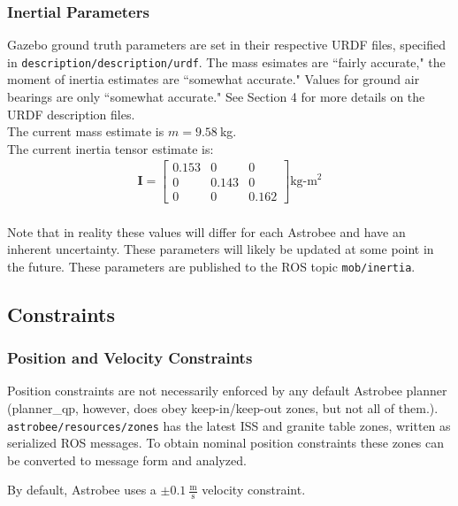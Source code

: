 \documentclass{article}
\begin{document}
\subsubsection{Inertial Parameters}

Gazebo ground truth parameters are set in their respective URDF files, specified in \texttt{description/description/urdf}. The mass esimates are ``fairly accurate," the moment of inertia estimates are ``somewhat accurate." Values for ground air bearings are only ``somewhat accurate." See Section 4 for more details on the URDF description files.
\\

The current mass estimate is $m = 9.58\ $kg.
\\

The current inertia tensor estimate is:
\begin{align*}
    \mathbf{I} =  
    \begin{bmatrix}
              0.153 & 0 & 0\\
              0 & 0.143 & 0\\
              0 & 0 & 0.162
    \end{bmatrix}  \text{kg-m}^2\\
\end{align*}

\noindent Note that in reality these values will differ for each Astrobee and have an inherent uncertainty. These parameters will likely be updated at some point in the future. These parameters are published to the ROS topic \texttt{mob/inertia}.

\subsection{Constraints}
\subsubsection{Position and Velocity Constraints}

Position constraints are not necessarily enforced by any default Astrobee planner (planner\_qp, however, does obey keep-in/keep-out zones, but not all of them.). \texttt{astrobee/resources/zones} has the latest ISS and granite table zones, written as serialized ROS messages. To obtain nominal position constraints these zones can be converted to message form and analyzed.

By default, Astrobee uses a $\pm 0.1 \ \frac{\text{m}}{\text{s}}$ velocity constraint.
\end{document}
